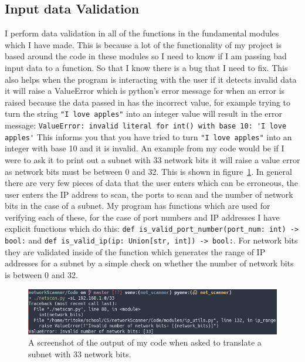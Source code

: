 \documentclass[titlepage]{article}
\let\Oldsubsection\subsection{}
\renewcommand{\subsection}{\FloatBarrier\Oldsubsection}
\begin{document}
\subsection{Input data Validation}

I perform data validation in all of the functions in the fundamental modules
which I have made. This is because a lot of the functionality of my project
is based around the code in these modules so I need to know if I am passing
bad input data to a function. So that I know there is a bug that I need to
fix. This also helps when the program is interacting with the user if it
detects invalid data it will raise a ValueError which is python's error
message for when an error is raised because the data passed in has the
incorrect value, for example trying to turn the string \verb|"I love apples"|
into an integer value will result in the error message:
\verb|ValueError: invalid literal for int() with base 10: 'I love apples'|
This informs you that you have tried to turn \verb|"I love apples"|
into an integer with base 10 and it is invalid. An example from
my code would be if I were to ask it to print out a subnet with 33 network
bits it will raise a value error as network bits must be between 0 and 32.
This is shown in figure~\ref{validation}.
In general there are very few pieces of data that the user enters which can be erroneous,
the user enters the IP address to scan, the ports to scan and the number of network bits
in the case of a subnet. My program has functions which are used for verifying each of
these, for the case of port numbers and IP addresses I have explicit functions which
do this: \verb|def is_valid_port_number(port_num: int) -> bool:| and
\verb|def is_valid_ip(ip: Union[str, int]) -> bool:|. For network bits they are validated
inside of the function which generates the range of IP addresses for a subnet by a simple
check on whether the number of network bits is between 0 and 32.

\begin{figure}[H]
  \centering
  \includegraphics[width=\textwidth]{validation.png}
  \caption{%
    A screenshot of the output of my code when asked to translate a subnet with 33 network bits.
  }\label{validation}
\end{figure}
\end{document}
